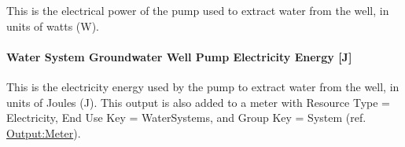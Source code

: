 This is the electrical power of the pump used to extract water from the well, in units of watts (W).

\paragraph{Water System Groundwater Well Pump Electricity Energy {[}J{]}}\label{water-system-groundwater-well-pump-electric-energy-j}

This is the electricity energy used by the pump to extract water from the well, in units of Joules (J). This output is also added to a meter with Resource Type = Electricity, End Use Key = WaterSystems, and Group Key = System (ref. \hyperref[outputmeter-and-outputmetermeterfileonly]{Output:Meter}).
